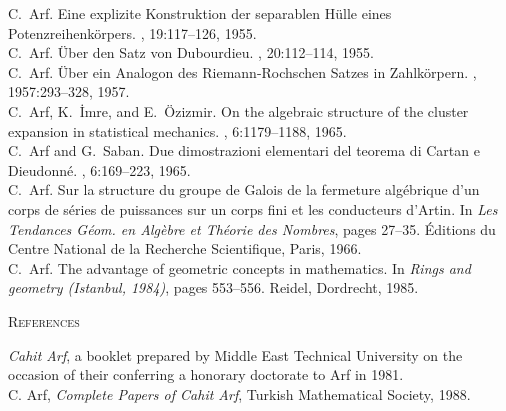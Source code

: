 \documentclass[12pt]{amsart}
\begin{document}
\begin{thebibliography}{10}
C.~Arf.
\newblock Eine explizite {K}onstruktion der separablen {H}\"ulle eines
  {P}otenzreihenk\"orpers.
, 19:117--126, 1955. \\

C.~Arf.
\newblock \"{U}ber den {S}atz von {D}ubourdieu.
, 20:112--114, 1955. \\

C.~Arf.
\newblock \"{U}ber ein {A}nalogon des {R}iemann-{R}ochschen {S}atzes in
  {Z}ahlk\"orpern.
, 1957:293--328, 1957. \\

C.~Arf, K.~{\.I}mre, and E.~{\"O}zizmir.
\newblock On the algebraic structure of the cluster expansion in statistical
  mechanics.
, 6:1179--1188, 1965. \\

C.~Arf and G.~Saban.
\newblock Due dimostrazioni elementari del teorema di {C}artan e {D}ieudonn\'e.
, 6:169--223, 1965. \\

C.~Arf.
\newblock Sur la structure du groupe de {G}alois de la fermeture alg\'ebrique
  d'un corps de s\'eries de puissances sur un corps fini et les conducteurs
  d'{A}rtin.
\newblock In {\em Les Tendances G\'eom. en Alg\`ebre et Th\'eorie des Nombres},
  pages 27--35. \'Editions du Centre National de la Recherche Scientifique,
  Paris, 1966. \\

C.~Arf.
\newblock The advantage of geometric concepts in mathematics.
\newblock In {\em Rings and geometry (Istanbul, 1984)}, pages 553--556. Reidel,
  Dordrecht, 1985.  \\

{\quad}

\textsc{\large References}

{\quad}

 \emph{Cahit Arf}, a booklet prepared by Middle East Technical University on the occasion of their conferring a honorary doctorate to Arf in 1981. \\

 C. Arf, {\it Complete Papers of Cahit Arf}, Turkish Mathematical Society, 1988. \\


\end{thebibliography}
\end{document}
